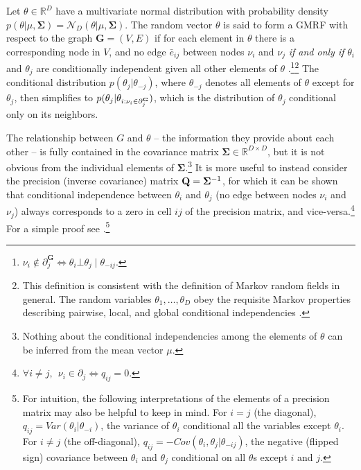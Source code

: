 Let $\theta \in \mathbb{R}^D$ have a multivariate normal distribution with probability 
density $p(\theta | \mu, \boldsymbol{\Sigma}) = \mathcal{N}_D (\theta | \mu, \boldsymbol{\Sigma})$. 
The random vector $\theta$ is said to form a GMRF with respect to the graph $\mathbf{G} = (V,E)$ if 
for each element in $\theta$ there is a corresponding node in $V$, and no edge $\bar{e}_{ij}$ between 
nodes $\nu_i$ and $\nu_j$ \emph{if and only if} $\theta_i$ and $\theta_j$ are conditionally independent 
given all other elements of $\theta$ .\footnote{$\nu_i \notin 
\partial^\mathbf{G}_{j} \iff \theta_i \bot \theta_j \mid \theta_{-ij}.$}\footnote{This definition is consistent 
with the definition of Markov random fields in general. The random variables $\theta_1, \dots, \theta_D$ 
obey the requisite Markov properties describing pairwise, local, and global conditional independencies .} The conditional distribution $p(\theta_j | \theta_{-j})$, where $\theta_{-j}$
denotes all elements of $\theta$ except for $\theta_j$, then simplifies to  $p(\theta_j |  \theta_{i : \nu_i \in \partial^{\mathbf{G}}_j})$, which is the distribution of $\theta_j$ conditional only on its neighbors. 

The relationship between $G$ and $\theta$ -- the information they provide about each other -- is fully 
contained in the covariance matrix $\boldsymbol{\Sigma} \in \mathbb{R}^{D\times D}$, but it is not 
obvious from the individual elements of $\boldsymbol{\Sigma}$.\footnote{Nothing about the conditional 
independencies among the elements of $\theta$ can be inferred from the mean vector $\mu$.} It is 
more useful to instead consider the precision (inverse covariance) matrix 
$\mathbf{Q} =\boldsymbol{\Sigma}^{-1}$, for which it can be shown that conditional independence between 
$\theta_i$ and $\theta_j$ (no edge between nodes $\nu_i$ and $\nu_j$) always corresponds to a zero in 
cell $ij$ of the precision matrix, and vice-versa.\footnote{$\forall i \neq j, \:\: \nu_i \in \partial_j \iff q_{ij} = 0$.}  
For a simple proof see .\footnote{For intuition, the following interpretations of 
the elements of a precision matrix may also be helpful to keep in mind. For $i = j$ (the diagonal),  
$q_{ij} = Var(\theta_i | \theta_{-i})$, the variance of $\theta_i$ conditional all the variables except 
$\theta_i$. For $i \neq j$ (the off-diagonal), $q_{ij}  = -Cov(\theta_i, \theta_j | \theta_{-ij}) $, the negative 
(flipped sign) covariance between $\theta_i$ and $\theta_j$ conditional on all $\theta$s except $i$ and $j$.}






